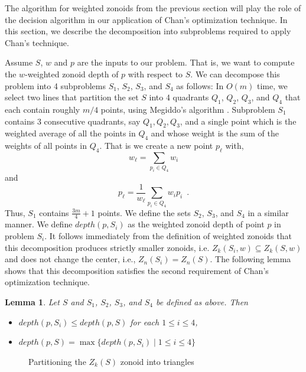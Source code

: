 \documentclass{elsart}
\newtheorem{lemma}{Lemma}
\begin{document}
The algorithm for weighted zonoids from the previous section will play
the role of the decision algorithm in our application of Chan's
optimization technique.  In this section, we describe the
decomposition into subproblems required to apply Chan's technique.

Assume $S$, $w$ and $p$ are the inputs to our problem.  That is, we
want to compute the $w$-weighted zonoid depth of $p$ with respect to
$S$.   We can decompose this problem into 4 subproblems $S_1$, $S_2$,
$S_3$, and $S_4$ as follows: In $O(m)$ time, we select two lines that partition the
set $S$ into 4 quadrants $Q_1$, $Q_2$, $Q_3$, and $Q_4$ that
each contain roughly $m/4$ points, using Megiddo's 
algorithm \cite{partitioning_with_two_lines_in_the_plane}. Subproblem
$S_1$ contains 3 consecutive quadrants, say $Q_1, Q_2, Q_3$, and a
single point which is the weighted average of all the points in
$Q_4$ and whose weight is the sum of the weights of all points in
$Q_4$.  That is we create a new point $p_\ell$ with, 
\[
     w_\ell = \sum_{p_i\in Q_4} w_i
\]
and
\[
     p_\ell = \frac{1}{w_\ell}\sum_{p_i\in Q_4} w_ip_i \enspace .
\]
Thus, $S_1$ contains $\frac{3m}{4}+1$ points. We define the sets
$S_2$, $S_3$, and $S_4$ in a similar manner.  We define $depth(p,S_i)$
as the weighted zonoid depth of point $p$ in problem $S_i$. It follows
immediately from the definition of weighted zonoids that 
this decomposition produces strictly smaller zonoids, i.e.
$Z_k(S_i,w) \subseteq Z_k(S,w)$ and does not change the center, i.e.,
$Z_n(S_i)=Z_n(S)$.  The following lemma shows that this
decomposition satisfies the second requirement of Chan's optimization
technique.

\begin{lemma}\label{lemma_final} Let $S$ and $S_1$, $S_2$, $S_3$, and
$S_4$ be defined as above.  Then
\begin{itemize} \item[a.]
$depth(p,S_i) \le depth(p,S)$ for each $1 \le i \le 4$, \item[b.]
$depth(p,S) = \max\{depth(p,S_i) \mid 1 \le i \le 4\}$ \end{itemize}
\end{lemma}

\begin{figure}
 \begin{center}
   \caption{\label{fig_for_proof}Partitioning the $Z_k(S)$ zonoid into triangles}
 \end{center}
\end{figure}
\end{document}
